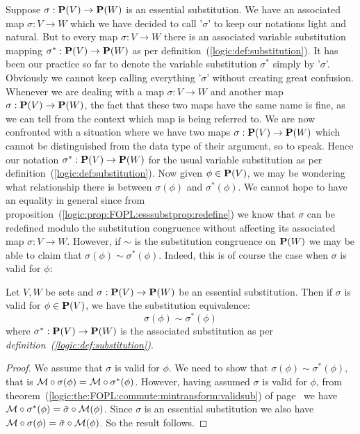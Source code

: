 Suppose $\sigma:\mbox{${\bf P}(V)$}\to{\bf P}(W)$ is an essential substitution. We
have an associated map $\sigma:V\to W$ which we have decided to call
'$\sigma$' to keep our notations light and natural. But to every map
$\sigma:V\to W$ there is an associated variable substitution mapping
$\sigma^{*}:\mbox{${\bf P}(V)$}\to{\bf P}(W)$ as per
definition~(\ref{logic:def:substitution}). It has been our practice
so far to denote the variable substitution $\sigma^{*}$ simply by
'$\sigma$'. Obviously we cannot keep calling everything '$\sigma$'
without creating great confusion. Whenever we are dealing with a map
$\sigma:V\to W$ and another map $\sigma:\mbox{${\bf P}(V)$}\to{\bf P}(W)$, the fact
that these two maps have the same name is fine, as we can tell from
the context which map is being referred to. We are now confronted
with a situation where we have two maps $\sigma:\mbox{${\bf P}(V)$}\to{\bf P}(W)$
which cannot be distinguished from the data type of their argument,
so to speak. Hence our notation $\sigma^{*}:\mbox{${\bf P}(V)$}\to{\bf P}(W)$ for
the usual variable substitution as per
definition~(\ref{logic:def:substitution}). Now given $\phi\in\mbox{${\bf P}(V)$}$,
we may be wondering what relationship there is between
$\sigma(\phi)$ and $\sigma^{*}(\phi)$. We cannot hope to have an
equality in general since from
proposition~(\ref{logic:prop:FOPL:esssubstprop:redefine}) we know
that $\sigma$ can be redefined modulo the substitution congruence
without affecting its associated map $\sigma:V\to W$. However, if
$\sim$ is the substitution congruence on ${\bf P}(W)$ we may be able
to claim that $\sigma(\phi)\sim\sigma^{*}(\phi)$. Indeed, this is of
course the case when $\sigma$ is valid for $\phi$:
\begin{prop}\label{logic:prop:FOPL:esssubstprop:validity}
Let $V,W$ be sets and $\sigma:\mbox{${\bf P}(V)$}\to{\bf P}(W)$ be an essential
substitution. Then if $\sigma$ is valid for $\phi\in\mbox{${\bf P}(V)$}$, we have
the substitution equivalence:
    \[
    \sigma(\phi)\sim\sigma^{*}(\phi)
    \]
where $\sigma^{*}:\mbox{${\bf P}(V)$}\to{\bf P}(W)$ is the associated substitution
as per {\em definition~(\ref{logic:def:substitution})}.
\end{prop}
\begin{proof}
We assume that $\sigma$ is valid for $\phi$. We need to show that
$\sigma(\phi)\sim\sigma^{*}(\phi)$, that is ${\cal
M}\circ\sigma(\phi)={\cal M}\circ\sigma^{*}(\phi)$. However, having
assumed $\sigma$ is valid for $\phi$, from
theorem~(\ref{logic:the:FOPL:commute:mintransform:validsub}) of
page~\pageref{logic:the:FOPL:commute:mintransform:validsub} we have
${\cal M}\circ\sigma^{*}(\phi)=\bar{\sigma}\circ{\cal M}(\phi)$.
Since $\sigma$ is an essential substitution we also have ${\cal
M}\circ\sigma(\phi)=\bar{\sigma}\circ{\cal M}(\phi)$. So the result
follows.
\end{proof}

